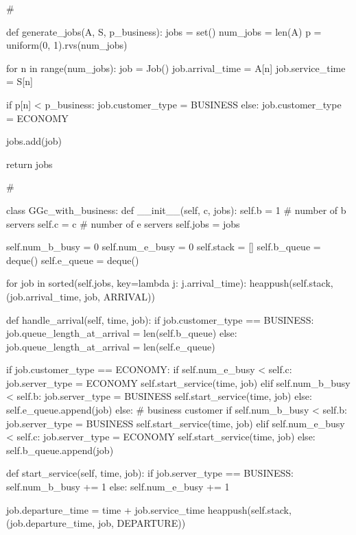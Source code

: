 \begin{exercise}
\begin{solution}
\begin{pyverbatim}
# %


def generate_jobs(A, S, p_business):
    jobs = set()
    num_jobs = len(A)
    p = uniform(0, 1).rvs(num_jobs)

    for n in range(num_jobs):
        job = Job()
        job.arrival_time = A[n]
        job.service_time = S[n]

        if p[n] < p_business:
            job.customer_type = BUSINESS
        else:
            job.customer_type = ECONOMY

        jobs.add(job)

    return jobs


# %


class GGc_with_business:
    def __init__(self, c, jobs):
        self.b = 1  # number of b servers
        self.c = c  # number of e servers
        self.jobs = jobs

        self.num_b_busy = 0
        self.num_e_busy = 0
        self.stack = []
        self.b_queue = deque()
        self.e_queue = deque()

        for job in sorted(self.jobs, key=lambda j: j.arrival_time):
            heappush(self.stack, (job.arrival_time, job, ARRIVAL))

    def handle_arrival(self, time, job):
        if job.customer_type == BUSINESS:
            job.queue_length_at_arrival = len(self.b_queue)
        else:
            job.queue_length_at_arrival = len(self.e_queue)

        if job.customer_type == ECONOMY:
            if self.num_e_busy < self.c:
                job.server_type = ECONOMY
                self.start_service(time, job)
            elif self.num_b_busy < self.b:
                job.server_type = BUSINESS
                self.start_service(time, job)
            else:
                self.e_queue.append(job)
        else:  # business customer
            if self.num_b_busy < self.b:
                job.server_type = BUSINESS
                self.start_service(time, job)
            elif self.num_e_busy < self.c:
                job.server_type = ECONOMY
                self.start_service(time, job)
            else:
                self.b_queue.append(job)

    def start_service(self, time, job):
        if job.server_type == BUSINESS:
            self.num_b_busy += 1
        else:
            self.num_e_busy += 1

        job.departure_time = time + job.service_time
        heappush(self.stack, (job.departure_time, job, DEPARTURE))


\end{pyverbatim}
\end{solution}
\end{exercise}
